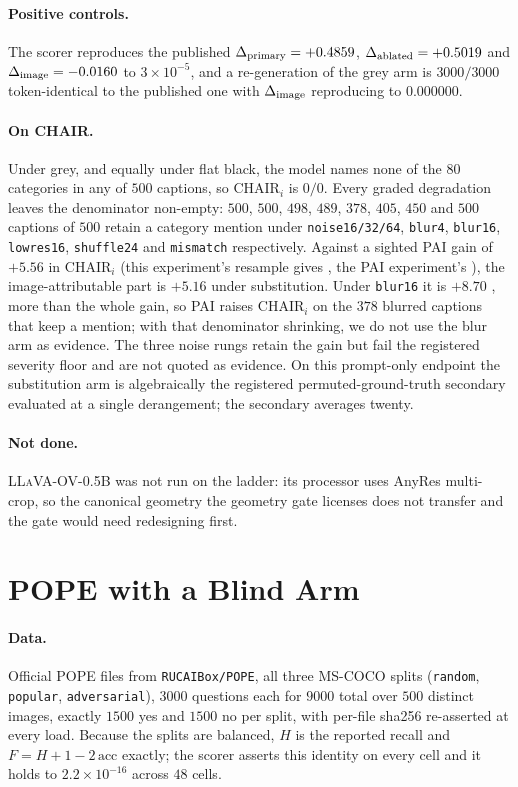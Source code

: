 \paragraph{Positive controls.} The scorer reproduces the published $\Delta_{\mathrm{primary}} = +0.4859$, $\Delta_{\mathrm{ablated}} =
+0.5019$ and $\Delta_{\mathrm{image}} = -0.0160$ to $3 \times 10^{-5}$, and a re-generation of the grey arm is
$3000/3000$ token-identical to the published one with $\Delta_{\mathrm{image}}$ reproducing to $0.000000$.

\paragraph{On CHAIR.} Under grey, and equally under flat black, the model names none of the $80$
categories in any of $500$ captions, so $\mathrm{CHAIR}_i$ is $0/0$. Every graded degradation leaves
the denominator non-empty: $500$, $500$, $498$, $489$, $378$, $405$, $450$ and $500$ captions of
$500$ retain a category mention under \texttt{noise16/32/64}, \texttt{blur4}, \texttt{blur16},
\texttt{lowres16}, \texttt{shuffle24} and \texttt{mismatch} respectively. Against a sighted PAI gain
of $+5.56$ in $\mathrm{CHAIR}_i$ (this experiment's resample gives , the PAI experiment's
), the image-attributable part is $+5.16$
 under substitution. Under \texttt{blur16} it is $+8.70$ ,
more than the whole gain, so PAI raises $\mathrm{CHAIR}_i$ on the $378$ blurred captions that keep a
mention; with that denominator shrinking, we do not use the blur arm as evidence. The
three noise rungs retain the gain but fail the registered severity floor and are not quoted as
evidence. On this prompt-only endpoint the substitution arm is algebraically the registered
permuted-ground-truth secondary evaluated at a single derangement; the secondary averages twenty.

\paragraph{Not done.} \textsc{LLaVA-OV-0.5B} was not run on the ladder: its processor uses AnyRes
multi-crop, so the canonical geometry the geometry gate licenses does not transfer and the gate
would need redesigning first.


\section{POPE with a Blind Arm}
\label{app:pope}

\paragraph{Data.} Official POPE files from \texttt{RUCAIBox/POPE}, all three MS-COCO splits
(\texttt{random}, \texttt{popular}, \texttt{adversarial}), $3000$ questions each for $9000$ total
over $500$ distinct images, exactly $1500$ yes and $1500$ no per split, with per-file sha256
re-asserted at every load. Because the splits are balanced, $H$ is the reported recall and
$F = H + 1 - 2\,\mathrm{acc}$ exactly; the scorer asserts this identity on every cell and it holds
to $2.2\times10^{-16}$ across $48$ cells.

